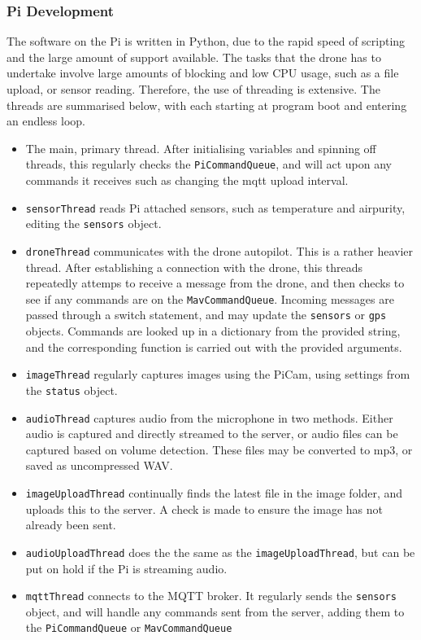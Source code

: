 \documentclass{article}
\begin{document}
\subsubsection{Pi Development}
The software on the Pi is written in Python, due to the rapid speed of scripting and the large amount of support available. The tasks that the drone has to undertake involve large amounts of blocking and low CPU usage, such as a file upload, or sensor reading. Therefore, the use of threading is extensive. The threads are summarised below, with each starting at program boot and entering an endless loop. 
\begin{itemize}
	\item The main, primary thread. After initialising variables and spinning off threads, this regularly checks the \texttt{PiCommandQueue}, and will act upon any commands it receives such as changing the mqtt upload interval.
	\item \texttt{sensorThread} reads Pi attached sensors, such as temperature and airpurity, editing the \texttt{sensors} object.
	\item \texttt{droneThread} communicates with the drone autopilot. This is a rather heavier thread. After establishing a connection with the drone, this threads repeatedly attemps to receive a message from the drone, and then checks to see if any commands are on the \texttt{MavCommandQueue}. Incoming messages are passed through a switch statement, and may update the \texttt{sensors} or \texttt{gps} objects. Commands are looked up in a dictionary from the provided string, and the corresponding function is carried out with the provided arguments. 
	\item \texttt{imageThread} regularly captures images using the PiCam, using settings from the \texttt{status} object.
	\item \texttt{audioThread} captures audio from the microphone in two methods. Either audio is captured and directly streamed to the server, or audio files can be captured based on volume detection. These files may be converted to mp3, or saved as uncompressed WAV.
	\item \texttt{imageUploadThread} continually finds the latest file in the image folder, and uploads this to the server. A check is made to ensure the image has not already been sent.
	\item \texttt{audioUploadThread} does the the same as the \texttt{imageUploadThread}, but can be put on hold if the Pi is streaming audio.
	\item \texttt{mqttThread} connects to the MQTT broker. It regularly sends the \texttt{sensors} object, and will handle any commands sent from the server, adding them to the \texttt{PiCommandQueue} or \texttt{MavCommandQueue}
\end{itemize}
\end{document}
